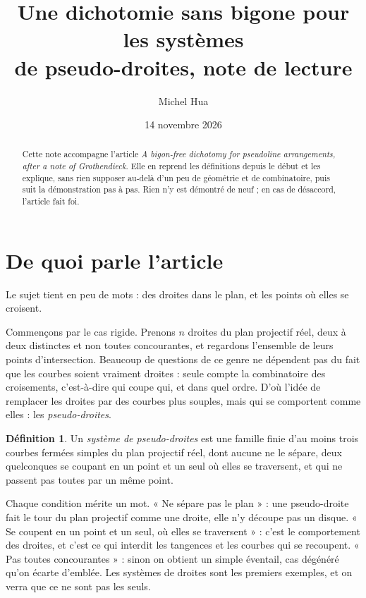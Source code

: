 \documentclass[11pt,a4paper]{amsart}
\title[Note de lecture : la dichotomie sans bigone]{Une dichotomie sans bigone pour les systèmes\\ de pseudo-droites, note de lecture}
\author{Michel Hua}
\date{14 novembre 2026}
\theoremstyle{definition}
\newtheorem{definition}{Définition}
\theoremstyle{plain}
\theoremstyle{remark}
\begin{document}
\maketitle

\begin{abstract}
Cette note accompagne l'article \emph{A bigon-free dichotomy for pseudoline arrangements, after a note of Grothendieck}. Elle en reprend les définitions depuis le début et les explique, sans rien supposer au-delà d'un peu de géométrie et de combinatoire, puis suit la démonstration pas à pas. Rien n'y est démontré de neuf ; en cas de désaccord, l'article fait foi.
\end{abstract}

\section{De quoi parle l'article}

Le sujet tient en peu de mots : des droites dans le plan, et les points où elles se croisent.

Commençons par le cas rigide. Prenons $n$ droites du plan projectif réel, deux à deux distinctes et non toutes concourantes, et regardons l'ensemble de leurs points d'intersection. Beaucoup de questions de ce genre ne dépendent pas du fait que les courbes soient vraiment droites : seule compte la combinatoire des croisements, c'est-à-dire qui coupe qui, et dans quel ordre. D'où l'idée de remplacer les droites par des courbes plus souples, mais qui se comportent comme elles : les \emph{pseudo-droites}.

\begin{definition}
Un \emph{système de pseudo-droites} est une famille finie d'au moins trois courbes fermées simples du plan projectif réel, dont aucune ne le sépare, deux quelconques se coupant en un point et un seul où elles se traversent, et qui ne passent pas toutes par un même point.
\end{definition}

Chaque condition mérite un mot. « Ne sépare pas le plan » : une pseudo-droite fait le tour du plan projectif comme une droite, elle n'y découpe pas un disque. « Se coupent en un point et un seul, où elles se traversent » : c'est le comportement des droites, et c'est ce qui interdit les tangences et les courbes qui se recoupent. « Pas toutes concourantes » : sinon on obtient un simple éventail, cas dégénéré qu'on écarte d'emblée. Les systèmes de droites sont les premiers exemples, et on verra que ce ne sont pas les seuls.
\end{document}
